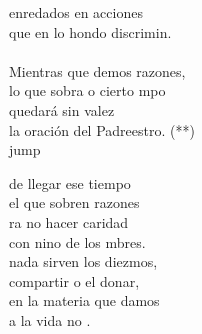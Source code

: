 \begin{cancion}
enredados en acciones \\
	que en lo hondo discrimin.\\
	\jump\\
Mientras que demos razones, \\
	lo que sobra o cierto mpo\\
	quedará sin valez \\
	la oración del Padreestro. (**)\\jump\\
	\begin{chorus}%
	de llegar ese tiempo \\
	el que sobren razones\\
	ra no hacer caridad \\
	con nino de los mbres.\\
	nada sirven los diezmos,\\
	compartir o el donar,\\
	 en la materia que damos\\
	a la vida no .   \\
	\end{chorus}%
	\jump\\
\end{cancion}%
